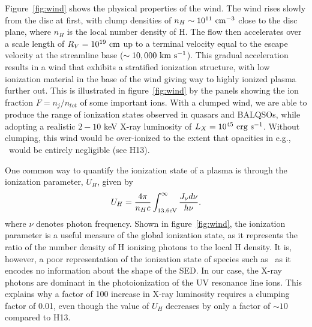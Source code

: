 \documentclass[useAMS,usenatbib]{mn2e_x}
\begin{document}
\noindent
Figure~\ref{fig:wind} shows the physical properties of the wind.
The wind rises slowly from the disc at first, with clump densities 
of $n_H \sim 10^{11}~\rm{cm^{-3}}$ close to the disc plane, 
where $n_H$ is the local number density of H.
The flow then accelerates over a scale length of $R_V=10^{19}~\rm{cm}$
up to a terminal velocity equal to the escape velocity at the streamline base
($\sim10,000~\rm{km~s^{-1}}$). This gradual acceleration results in
a wind that exhibits a stratified ionization structure, with low ionization material
in the base of the wind giving way to highly ionized plasma further out.
This is illustrated in figure~\ref{fig:wind} 
by the panels showing the ion fraction $F=n_j/n_{tot}$ of some important ions.
With a clumped wind, we are able to produce the range of ionization states observed
in quasars and BALQSOs, while adopting a realistic $2-10$ keV X-ray luminosity
of $L_{X}=10^{45}~\rm{erg~s^{-1}}$. Without clumping, this wind would be over-ionized 
to the extent that opacities in e.g., \civ\ would be entirely negligible (see H13).

One common way to quantify the ionization state of a plasma
is through the ionization parameter, $U_H$, given by
\begin{equation}
U_H = \frac{4\pi}{n_H c}\int_{13.6{\rm{eV}}}^{\infty}\frac{{J_{\nu}d\nu}}{h\nu}.
\end{equation}
\noindent where $\nu$ denotes photon 
frequency. Shown in figure~\ref{fig:wind},
the ionization parameter is a useful measure of the global ionization state,
as it represents the ratio of the number density of 
H ionizing photons to the local H density.
It is, however, a poor representation of the 
ionization state of species such as \civ\ as it encodes no information
about the shape of the SED. In our case, the X-ray photons 
are dominant in the photoionization of the UV resonance line ions. 
This explains why a factor of 100 increase in X-ray luminosity requires
a clumping factor of 0.01, even though the value of $U_H$ decreases by only a factor of $\sim10$ compared to H13. 
\end{document}
